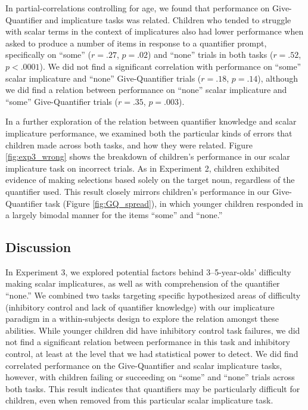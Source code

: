 \documentclass[man]{apa2}
\begin{document}
In partial-correlations controlling for age, we found that performance on Give-Quantifier and implicature tasks was related. Children who tended to struggle with scalar terms in the context of implicatures also had lower performance when asked to produce a number of items in response to a quantifier prompt, specifically on ``some''  ($r = .27$, $p = .02$) and ``none'' trials in both tasks ($r = .52$, $p < .0001$). We did not find a significant correlation with performance on ``some'' scalar implicature and ``none'' Give-Quantifier trials ($r = .18$, $p = .14$), although we did find a relation between performance on ``none'' scalar implicature and ``some'' Give-Quantifier trials ($r = .35$, $p = .003$).

In a further exploration of the relation between quantifier knowledge and scalar implicature performance, we examined both the particular kinds of errors that children made across both tasks, and how they were related. Figure \ref{fig:exp3_wrong} shows the breakdown of children's performance in our scalar implicature task on incorrect trials. As in Experiment 2, children exhibited evidence of making selections based solely on the target noun, regardless of the quantifier used. This result closely mirrors children's performance in our Give-Quantifier task (Figure \ref{fig:GQ_spread}), in which younger children responded in a largely bimodal manner for the items ``some'' and ``none.''

\subsection{Discussion}

In Experiment 3, we explored potential factors behind 3--5-year-olds' difficulty making scalar implicatures, as well as with comprehension of the quantifier ``none.'' We combined two tasks targeting specific hypothesized areas of difficulty (inhibitory control and lack of quantifier knowledge) with our implicature paradigm in a within-subjects design to explore the relation amongst these abilities. While younger children did have inhibitory control task failures, we did not find a significant relation between performance in this task and inhibitory control, at least at the level that we had statistical power to detect. We did find correlated performance on the Give-Quantifier and scalar implicature tasks, however, with children failing or succeeding on ``some'' and ``none'' trials across both tasks. This result indicates that quantifiers may be particularly difficult for children, even when removed from this particular scalar implicature task.
\end{document}
